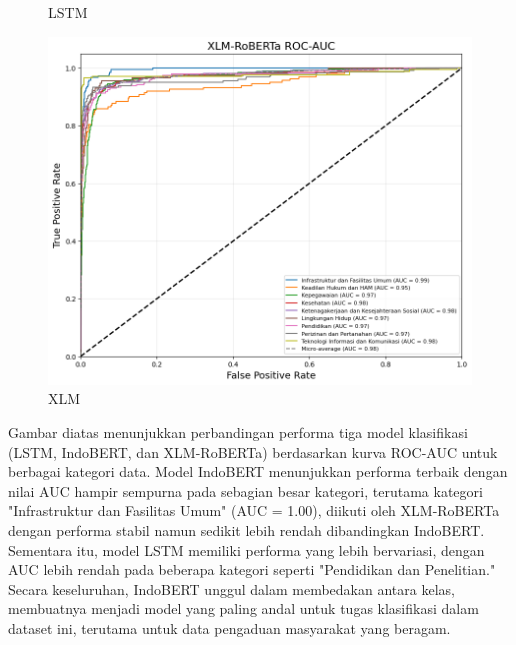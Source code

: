 \documentclass[12pt,a4paper]{article}
\begin{document}
\begin{adjustwidth}
\begin{figure}[H]
\begin{minipage}{0.3\textwidth}
        \caption*{LSTM}
        \label{fig:lstm}
    \end{minipage} \hfill
    \begin{minipage}{0.3\textwidth}
        \centering
        \includegraphics[width=\linewidth]{Image/roc-auc_xlm.png}
        \caption*{XLM}
        \label{fig:xlm}
    \end{minipage}
    \end{figure}
\end{adjustwidth}

\begin{adjustwidth}{3em}{0pt} 
    \hspace{0.5cm} Gambar diatas menunjukkan perbandingan performa tiga model klasifikasi (LSTM, IndoBERT, dan XLM-RoBERTa) berdasarkan kurva ROC-AUC untuk berbagai kategori data. Model IndoBERT menunjukkan performa terbaik dengan nilai AUC hampir sempurna pada sebagian besar kategori, terutama kategori "Infrastruktur dan Fasilitas Umum" (AUC = 1.00), diikuti oleh XLM-RoBERTa dengan performa stabil namun sedikit lebih rendah dibandingkan IndoBERT. Sementara itu, model LSTM memiliki performa yang lebih bervariasi, dengan AUC lebih rendah pada beberapa kategori seperti "Pendidikan dan Penelitian." Secara keseluruhan, IndoBERT unggul dalam membedakan antara kelas, membuatnya menjadi model yang paling andal untuk tugas klasifikasi dalam dataset ini, terutama untuk data pengaduan masyarakat yang beragam.
\end{adjustwidth}
\end{document}
